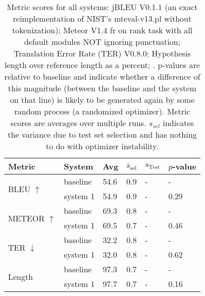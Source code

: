 \begin{table}[htb]
\begin{center}
\begin{footnotesize}
\begin{tabular}{|l|l|l|l|l|l|}
\hline
\bf Metric & \bf System & \bf Avg & \bf $\overline{s}_{\text{sel}}$ & \bf $s_{\text{Test}}$ & \bf $p$-value \\
\hline
\multirow{2}{*}{BLEU $\uparrow$}
& baseline & 54.6 & 0.9 & - & - \\
& system 1 & 54.9 & 0.9 & - & 0.29 \\
\hline
\multirow{2}{*}{METEOR $\uparrow$}
& baseline & 69.3 & 0.8 & - & - \\
& system 1 & 69.5 & 0.7 & - & 0.46 \\
\hline
\multirow{2}{*}{TER $\downarrow$}
& baseline & 32.2 & 0.8 & - & - \\
& system 1 & 32.0 & 0.8 & - & 0.62 \\
\hline
\multirow{2}{*}{Length }
& baseline & 97.3 & 0.7 & - & - \\
& system 1 & 97.7 & 0.7 & - & 0.16 \\
\hline
\end{tabular}
\end{footnotesize}
\end{center}
\caption{\label{tab:scores} Metric scores for all systems: jBLEU V0.1.1 (an exact reimplementation of NIST's mteval-v13.pl without tokenization); Meteor V1.4 fr on rank task with all default modules NOT ignoring punctuation; Translation Error Rate (TER) V0.8.0; Hypothesis length over reference length as a percent; . p-values are relative to baseline and indicate whether a difference of this magnitude (between the baseline and the system on that line) is likely to be generated again by some random process (a randomized optimizer). Metric scores are averages over multiple runs. $s_{sel}$ indicates the variance due to test set selection and has nothing to do with optimizer instability.}
\end{table}
